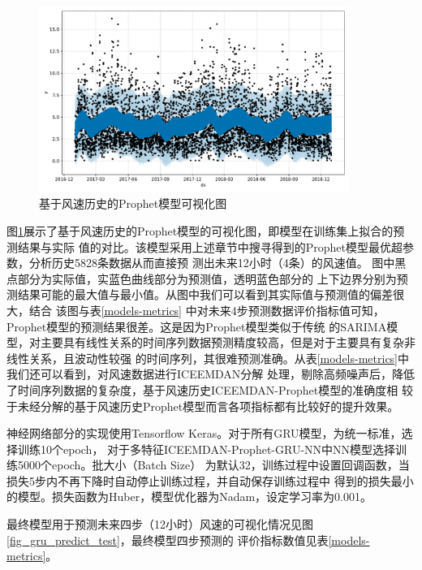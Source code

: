 \documentclass[AutoFakeBold]{LZUThesis}
\begin{document}
\begin{figure}[H]
	\centering
    \includegraphics[width=0.9\textwidth]{figures/prophet_wind.pdf}
    \caption{基于风速历史的Prophet模型可视化图}
    \label{fig_prophet_wind}
\end{figure}

图\ref{fig_prophet_wind}展示了基于风速历史的Prophet模型的可视化图，即模型在训练集上拟合的预测结果与实际
值的对比。该模型采用上述章节中搜寻得到的Prophet模型最优超参数，分析历史5828条数据从而直接预
测出未来12小时（4条）的风速值。
图中黑点部分为实际值，实蓝色曲线部分为预测值，透明蓝色部分的
上下边界分别为预测结果可能的最大值与最小值。从图中我们可以看到其实际值与预测值的偏差很大，结合
该图与表\ref{models-metrics}
中对未来4步预测数据评价指标值可知，Prophet模型的预测结果很差。这是因为Prophet模型类似于传统
的SARIMA模型，对主要具有线性关系的时间序列数据预测精度较高，但是对于主要具有复杂非线性关系，且波动性较强
的时间序列，其很难预测准确。从表\ref{models-metrics}中我们还可以看到，对风速数据进行ICEEMDAN分解
处理，剔除高频噪声后，降低了时间序列数据的复杂度，基于风速历史ICEEMDAN-Prophet模型的准确度相
较于未经分解的基于风速历史Prophet模型而言各项指标都有比较好的提升效果。

神经网络部分的实现使用Tensorflow Keras。对于所有GRU模型，为统一标准，选择训练10个epoch，
对于多特征ICEEMDAN-Prophet-GRU-NN中NN模型选择训练5000个epoch。批大小（Batch Size）
为默认32，训练过程中设置回调函数，当损失5步内不再下降时自动停止训练过程，并自动保存训练过程中
得到的损失最小的模型。损失函数为Huber，模型优化器为Nadam，设定学习率为0.001。

最终模型用于预测未来四步（12小时）风速的可视化情况见图\ref{fig_gru_predict_test}，最终模型四步预测的
评价指标数值见表\ref{models-metrics}。
\end{document}
